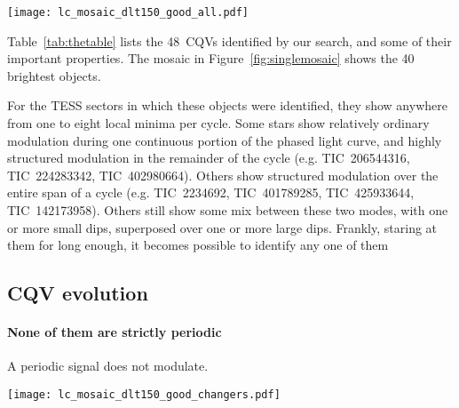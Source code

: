 \documentclass[11pt,twocolumn,tighten]{aastex63}
\newcommand{\ncpvsfound}{{48}}
\begin{document}
\begin{figure*}[!t]
	\begin{center}
    \centering
    \texttt{[image: lc\_mosaic\_dlt150\_good\_all.pdf]}
		\caption{
			{\bf CQVs from a search of the TESS 2-minute data at
      $d$$<$150\,pc, acquired between July~2018 and Sep~2022.}
      Phased TESS light curves over 1 month are shown for 40 CQVs;
      they include the brightest and closest examples of CQVs known
      ($V$=14; $J$=9.5; $d$=25\,pc).  Gray are raw 2-minute data;
      black bins to 300 points per cycle.  Periods in hours are listed
      in the lower right corners of each panel.
      {\bf todo:  add TIC IDs and sector numbers}.
		}
		\label{fig:singlemosaic}
	\end{center}
\end{figure*}


Table~\ref{tab:thetable} lists the \ncpvsfound\ CQVs identified by
our search, and some of their important properties.
The mosaic in Figure~\ref{fig:singlemosaic} shows the 40 brightest
objects.

For the TESS sectors in which these objects were identified, they show
anywhere from one to eight local minima per cycle.
Some stars show relatively ordinary modulation during one continuous
portion of the phased light curve, and highly structured modulation in
the remainder of the cycle (e.g. TIC~206544316, TIC~224283342,
TIC~402980664).
Others show structured modulation over the entire span of a cycle
(e.g. TIC~2234692, TIC~401789285, TIC~425933644, TIC~142173958).
Others still show some mix between these two modes,
with one or more small dips, superposed over one or more large dips.
Frankly, staring at them for long enough,
it becomes possible to identify any one of them



\subsection{CQV evolution}

\paragraph{None of them are strictly periodic}

A periodic signal does not modulate.



\begin{figure*}[!t]
	\begin{center}
			\centering
			\texttt{[image: lc\_mosaic\_dlt150\_good\_changers.pdf]}
		\vspace{-0.2cm}
		\caption{
		{\bf Evolution of CQVs}: ``Before and
      after'' for six CQVs from Figure~\ref{fig:revolution}.  Panels
      in the top two rows are separated by two years
      ($\approx$$10^3$ cycles); each panel shows one month.
      Periods are listed in hours. 
      {\bf todo: make these for everything.}
		}
		\label{fig:evoln}
	\end{center}
\end{figure*}
\end{document}
